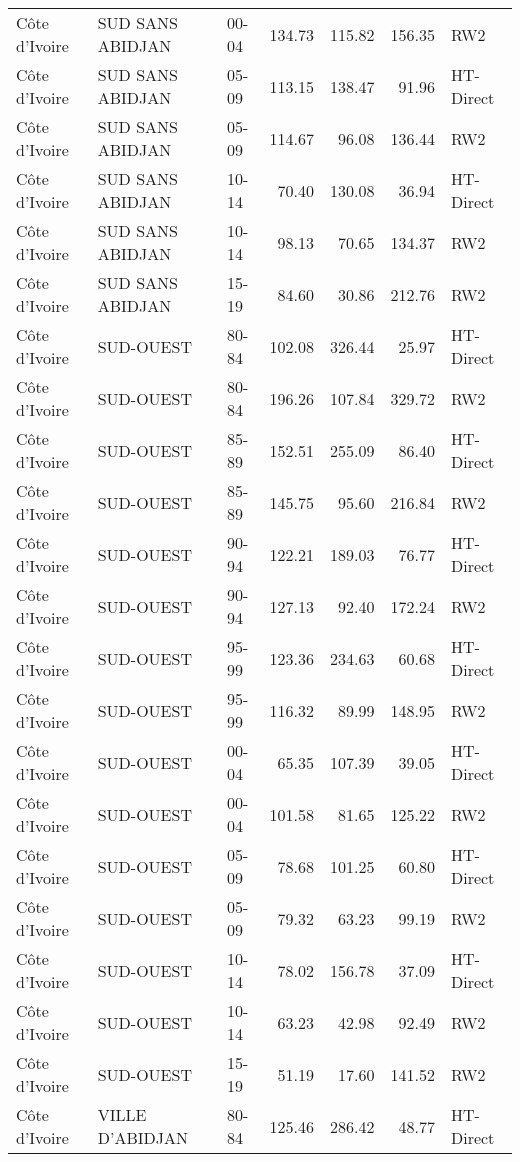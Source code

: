 \begin{longtable}{lllrrrl}
  C\^{o}te d'Ivoire & SUD SANS ABIDJAN & 00-04 & 134.73 & 115.82 & 156.35 & RW2 \\ 
  C\^{o}te d'Ivoire & SUD SANS ABIDJAN & 05-09 & 113.15 & 138.47 & 91.96 & HT-Direct \\ 
  C\^{o}te d'Ivoire & SUD SANS ABIDJAN & 05-09 & 114.67 & 96.08 & 136.44 & RW2 \\ 
  C\^{o}te d'Ivoire & SUD SANS ABIDJAN & 10-14 & 70.40 & 130.08 & 36.94 & HT-Direct \\ 
  C\^{o}te d'Ivoire & SUD SANS ABIDJAN & 10-14 & 98.13 & 70.65 & 134.37 & RW2 \\ 
  C\^{o}te d'Ivoire & SUD SANS ABIDJAN & 15-19 & 84.60 & 30.86 & 212.76 & RW2 \\ 
  C\^{o}te d'Ivoire & SUD-OUEST & 80-84 & 102.08 & 326.44 & 25.97 & HT-Direct \\ 
  C\^{o}te d'Ivoire & SUD-OUEST & 80-84 & 196.26 & 107.84 & 329.72 & RW2 \\ 
  C\^{o}te d'Ivoire & SUD-OUEST & 85-89 & 152.51 & 255.09 & 86.40 & HT-Direct \\ 
  C\^{o}te d'Ivoire & SUD-OUEST & 85-89 & 145.75 & 95.60 & 216.84 & RW2 \\ 
  C\^{o}te d'Ivoire & SUD-OUEST & 90-94 & 122.21 & 189.03 & 76.77 & HT-Direct \\ 
  C\^{o}te d'Ivoire & SUD-OUEST & 90-94 & 127.13 & 92.40 & 172.24 & RW2 \\ 
  C\^{o}te d'Ivoire & SUD-OUEST & 95-99 & 123.36 & 234.63 & 60.68 & HT-Direct \\ 
  C\^{o}te d'Ivoire & SUD-OUEST & 95-99 & 116.32 & 89.99 & 148.95 & RW2 \\ 
  C\^{o}te d'Ivoire & SUD-OUEST & 00-04 & 65.35 & 107.39 & 39.05 & HT-Direct \\ 
  C\^{o}te d'Ivoire & SUD-OUEST & 00-04 & 101.58 & 81.65 & 125.22 & RW2 \\ 
  C\^{o}te d'Ivoire & SUD-OUEST & 05-09 & 78.68 & 101.25 & 60.80 & HT-Direct \\ 
  C\^{o}te d'Ivoire & SUD-OUEST & 05-09 & 79.32 & 63.23 & 99.19 & RW2 \\ 
  C\^{o}te d'Ivoire & SUD-OUEST & 10-14 & 78.02 & 156.78 & 37.09 & HT-Direct \\ 
  C\^{o}te d'Ivoire & SUD-OUEST & 10-14 & 63.23 & 42.98 & 92.49 & RW2 \\ 
  C\^{o}te d'Ivoire & SUD-OUEST & 15-19 & 51.19 & 17.60 & 141.52 & RW2 \\ 
  C\^{o}te d'Ivoire & VILLE D'ABIDJAN & 80-84 & 125.46 & 286.42 & 48.77 & HT-Direct \\ 

\end{longtable}

